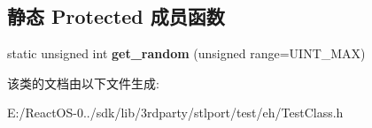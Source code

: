 \subsection*{静态 Protected 成员函数}
\begin{DoxyCompactItemize}
\item 
\mbox{\label{class_test_class_a0f2365962e1946dcbe144b4645e919cc}} 
static unsigned int {\bfseries get\+\_\+random} (unsigned range=U\+I\+N\+T\+\_\+\+M\+AX)
\end{DoxyCompactItemize}


该类的文档由以下文件生成\+:\begin{DoxyCompactItemize}
\item 
E\+:/\+React\+O\+S-\/0../sdk/lib/3rdparty/stlport/test/eh/Test\+Class.\+h\end{DoxyCompactItemize}
